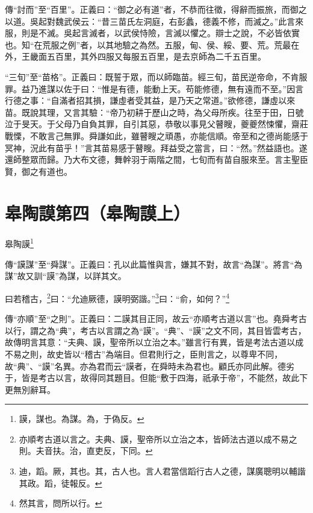 {\noindent\zhuan{}\fzbyks 傳“討而”至“百里”。正義曰：“御之必有道”者，不恭而往徵，得辭而振旅，而御之以道。吳起對魏武侯云：“昔三苗氏左洞庭，右彭蠡，德義不修，而滅之。”此言來服，則是不滅。吳起言滅者，以武侯恃險，言滅以懼之。辯士之說，不必皆依實也。知“在荒服之例”者，以其地驗之為然。五服，甸、侯、綏、要、荒。荒最在外，王畿面五百里，其外四服又每服五百里，是去京師為二千五百里。 \par}

{\noindent\shu{}\fzkt “三旬”至“苗格”。正義曰：既誓于眾，而以師臨苗。經三旬，苗民逆帝命，不肯服罪。益乃進謀以佐于曰：“惟是有德，能動上天。苟能修德，無有遠而不至。”因言行德之事：“自滿者招其損，謙虛者受其益，是乃天之常道。”欲修德，謙虛以來苗。既說其理，又言其驗：“帝乃初耕于歷山之時，為父母所疾。往至于田，日號泣于旻天。于父母乃自負其罪，自引其惡，恭敬以事見父瞽瞍，夔夔然悚懼，齋莊戰慄，不敢言己無罪。舜謙如此，雖瞽瞍之頑愚，亦能信順。帝至和之德尚能感于冥神，況此有苗乎！”言其苗易感于瞽瞍。拜益受之當言，曰：“然。”然益語也。遂還師整眾而歸。乃大布文德，舞幹羽于兩階之間，七旬而有苗自服來至。言主聖臣賢，御之有道也。 \par}

\section{皋陶謨第四（皋陶謨上）}


皋陶謨\footnote{謨，謀也。為謀。為，于偽反。}

{\noindent\zhuan{}\fzbyks 傳“謨謀”至“舜謀”。正義曰：孔以此篇惟與言，嫌其不對，故言“為謀”。將言“為謀”故又訓“謨”為謀，以詳其文。 \par}

曰若稽古，\footnote{亦順考古道以言之。夫典、謨，聖帝所以立治之本，皆師法古道以成不易之則。夫音扶。治，直吏反，下同。}曰：“允迪厥德，謨明弼諧。”\footnote{迪，蹈。厥，其也。其，古人也。言人君當信蹈行古人之德，謀廣聰明以輔諧其政。蹈，徒報反。}曰：“俞，如何？”\footnote{然其言，問所以行。}

{\noindent\zhuan{}\fzbyks 傳“亦順”至“之則”。正義曰：二謨其目正同，故云“亦順考古道以言”也。堯舜考古以行，謂之為“典”，考古以言謂之為“謨”。“典”、“謨”之文不同，其目皆雲考古，故傳明言其意：“夫典、謨，聖帝所以立治之本。”雖言行有異，皆是考法古道以成不易之則，故史皆以“稽古”為端目。但君則行之，臣則言之，以尊卑不同，故“典”、“謨”名異。亦為君而云“謨者，在舜時未為君也。顧氏亦同此解。德劣于，皆是考古以言，故得同其題目。但能“敷于四海，祇承于帝”，不能然，故此下更無別辭耳。 \par}

